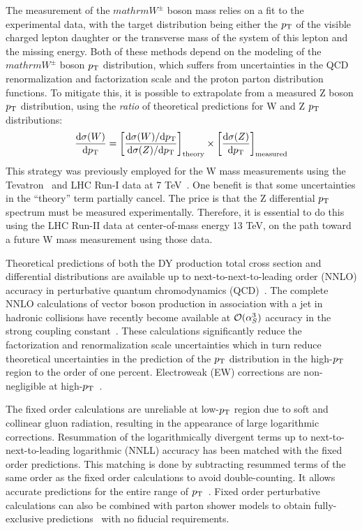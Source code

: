 The measurement of the $mathrm{W^\pm}$ boson mass relies on a fit to the experimental data, with the
target distribution being either the $p_{\mathrm{T}}$ of the visible charged lepton daughter
or the transverse mass of the system of this lepton and the missing energy.
Both of these methods depend on the modeling of the $mathrm{W^\pm}$ boson $p_{\mathrm{T}}$ distribution,
which suffers from uncertainties in the QCD renormalization and factorization scale and the proton parton distribution functions.
To mitigate this, it is possible to extrapolate from a measured Z boson $p_{\mathrm{T}}$ distribution, using
the \textit{ratio} of theoretical predictions for W and Z $p_{\mathrm{T}}$ distributions:
\begin{equation}
\frac{\mathrm{d}\sigma(W)}{\mathrm{d} p_{\mathrm{T}}} = \left[ \frac{\mathrm{d}\sigma(W)/\mathrm{d}p_{\mathrm{T}} }{\mathrm{d}\sigma(Z)/\mathrm{d} p_{\mathrm{T}} } \right]_\mathrm{theory} \times \left[ \frac{\mathrm{d}\sigma(Z)}{\mathrm{d} p_{\mathrm{T}}} \right]_\mathrm{measured}
\end{equation}
This strategy was previously employed for the W mass measurements using the Tevatron~\cite{Abazov:2012bv,Aaltonen:2012bp} and LHC Run-I data at 7 TeV~\cite{Aaboud:2017svj}.
One benefit is that some uncertainties in the ``theory'' term partially cancel.
The price is that the Z differential $p_{\mathrm{T}}$ spectrum must be measured experimentally.
Therefore, it is essential to do this using the LHC Run-II data at center-of-mass energy 13 TeV,
on the path toward a future W mass measurement using those data.
      
Theoretical predictions of both the DY production total cross section and 
differential distributions are available up to next-to-next-to-leading order 
(NNLO) accuracy in perturbative quantum chromodynamics 
(QCD)~\cite{Melnikov:2006kv,Catani:2009sm}. The complete NNLO calculations of 
vector boson production in association with a jet in hadronic collisions have 
recently become available at $\mathcal{O}(\alpha_S^3)$ accuracy in the strong 
coupling constant~\cite{Ridder:2015dxa,Boughezal:2015ded,Boughezal:2015dva}. 
These calculations significantly reduce the factorization and renormalization scale 
uncertainties which in turn reduce theoretical uncertainties in the prediction 
of the $p_{\mathrm{T}}$ distribution in the high-$p_{\mathrm{T}}$ region to the order of one 
percent. Electroweak (EW) corrections are non-negligible at 
high-$p_{\mathrm{T}}$~\cite{Dittmaier:2014qza,Lindert:2017olm}.      

The fixed order calculations are unreliable at low-$p_{\mathrm{T}}$ region due to soft 
and collinear gluon radiation, resulting in the appearance of large logarithmic 
corrections.
Resummation of the logarithmically divergent terms up to next-to-next-to-leading logarithmic (NNLL) accuracy has been matched with the fixed order predictions.
This matching is done by subtracting resummed terms of the same order as the fixed order calculations to avoid double-counting.
It allows accurate predictions for the entire range of $p_{\mathrm{T}}$~\cite{Balazs:1995nz,Catani:2015vma}.
Fixed order perturbative calculations can also be combined with parton shower models to obtain 
fully-exclusive predictions~\cite{MCatNLO,Nason:2004rx,Frixione:2002ik,Alioli:2010xd} with
no fiducial requirements.      

